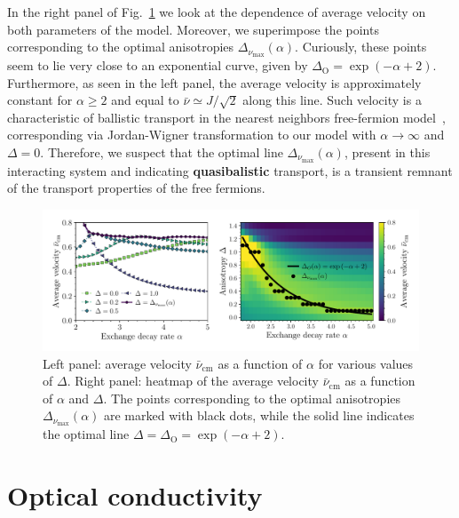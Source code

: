 In the right panel of Fig.~\ref{fig:optimal_velocity} we look at the dependence of average velocity on both
parameters of the model. Moreover, we superimpose the points corresponding to the
optimal anisotropies \(\Delta_{\nu_{\mathrm{max}}} (\alpha)\). Curiously, these points
seem to lie very close to an exponential curve, given by \(\Delta_{\mathrm{O}} = \exp\left(-\alpha + 2\right)\).
Furthermore, as seen in the left panel, the average velocity is approximately constant for \(\alpha \geq 2\) and equal to
\(\bar{\nu} \simeq J/\sqrt{2}\) along this line. Such velocity is a characteristic of ballistic
transport in the nearest neighbors free-fermion model~\autocite{Vidmar2013, Langer2012},
corresponding via Jordan-Wigner transformation to our model with \(\alpha \to \infty\) and \(\Delta = 0\).
Therefore, we suspect that the optimal line \(\Delta_{\nu_{\mathrm{max}}} (\alpha)\), present in this interacting
system and indicating \textbf{quasibalistic} transport, is a transient remnant of the transport properties of the free fermions.

\begin{figure}[htbp]
  \centering
  \includegraphics[width=\linewidth]{Figures/optimal_velocity.pdf}
  \caption{Left panel: average velocity \(\bar{\nu}_{\text{cm}}\) as a function of \(\alpha\) for various values of \(\Delta\).
  Right panel: heatmap of the average velocity \(\bar{\nu}_{\text{cm}}\) as a function of \(\alpha\) and \(\Delta\). The points
  corresponding to the optimal anisotropies \(\Delta_{\nu_{\mathrm{max}}} (\alpha)\) are marked with black dots, while the solid line
  indicates the optimal line \(\Delta = \Delta_{\mathrm{O}} = \exp\left(-\alpha + 2\right)\).}
  \label{fig:optimal_velocity}
\end{figure}


\section{Optical conductivity}


